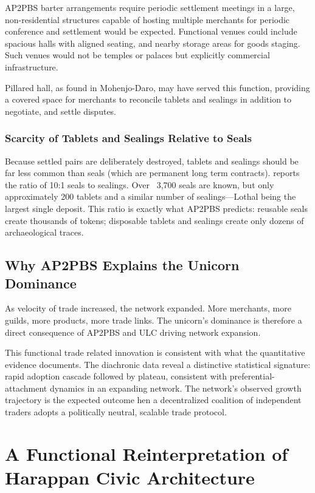\documentclass[12pt]{article}
\begin{document}
AP2PBS barter arrangements require periodic settlement meetings in a large, non-residential
structures capable of hosting multiple merchants for periodic conference and settlement
would be expected. Functional venues could include spacious halls with aligned seating,
and nearby storage areas for goods staging. Such venues would not be temples or palaces
but explicitly commercial infrastructure.

Pillared hall, as found in Mohenjo-Daro, may have served this function, providing a
covered space for merchants to reconcile tablets and sealings in addition to negotiate,
and settle disputes.

\subsubsection{Scarcity of Tablets and Sealings Relative to Seals}

Because settled pairs are deliberately destroyed, tablets and sealings should be far
less common than seals (which are permanent long term contracts). \citet{frenez2024}
reports the ratio of 10:1 seals to sealings. Over ~3,700 seals are known, but only
approximately 200 tablets and a similar number of sealings—Lothal being the largest
single deposit. This ratio is exactly what AP2PBS predicts: reusable seals create
thousands of tokens; disposable tablets and sealings create only dozens of
archaeological traces.

\subsection{Why AP2PBS Explains the Unicorn Dominance}

As velocity of trade increased, the network expanded. More merchants, more guilds, more
products, more trade links.  The unicorn's dominance is therefore a direct consequence
of AP2PBS and ULC driving network expansion.

This functional trade related innovation is consistent with what the quantitative evidence
documents.  The diachronic data reveal a distinctive statistical signature: rapid adoption
cascade followed by plateau, consistent with preferential-attachment dynamics in
an expanding network.  The network's observed growth trajectory is the expected outcome
hen a decentralized coalition of independent traders adopts a politically neutral,
scalable trade protocol.

\section{A Functional Reinterpretation of Harappan Civic Architecture}
\end{document}

